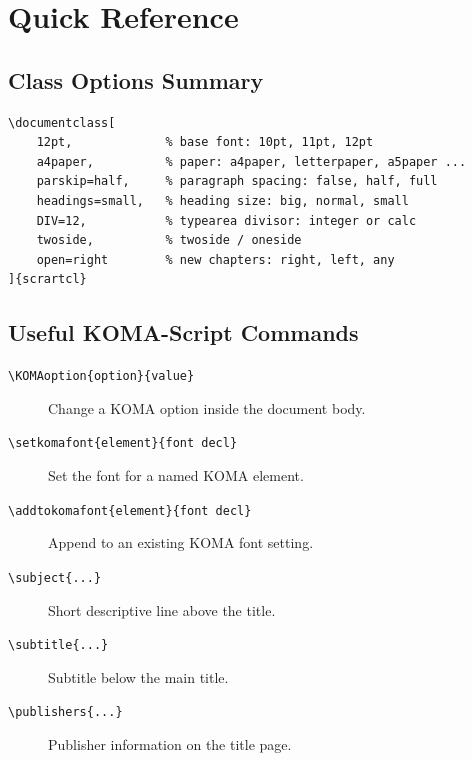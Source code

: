 \documentclass[
    12pt,               %
    a4paper,            %
    parskip=half,       %
    headings=small,     %
    DIV=12              %
]{scrartcl}
\begin{document}

\section{Quick Reference}
\label{sec:reference}

\subsection{Class Options Summary}

\begin{verbatim}
\documentclass[
    12pt,             % base font: 10pt, 11pt, 12pt
    a4paper,          % paper: a4paper, letterpaper, a5paper ...
    parskip=half,     % paragraph spacing: false, half, full
    headings=small,   % heading size: big, normal, small
    DIV=12,           % typearea divisor: integer or calc
    twoside,          % twoside / oneside
    open=right        % new chapters: right, left, any
]{scrartcl}
\end{verbatim}

\subsection{Useful KOMA-Script Commands}

\begin{description}
    \item[\texttt{\textbackslash KOMAoption\{option\}\{value\}}]
        Change a KOMA option inside the document body.
    \item[\texttt{\textbackslash setkomafont\{element\}\{font decl\}}]
        Set the font for a named KOMA element.
    \item[\texttt{\textbackslash addtokomafont\{element\}\{font decl\}}]
        Append to an existing KOMA font setting.
    \item[\texttt{\textbackslash subject\{...\}}]
        Short descriptive line above the title.
    \item[\texttt{\textbackslash subtitle\{...\}}]
        Subtitle below the main title.
    \item[\texttt{\textbackslash publishers\{...\}}]
        Publisher information on the title page.
\end{description}
\end{document}
